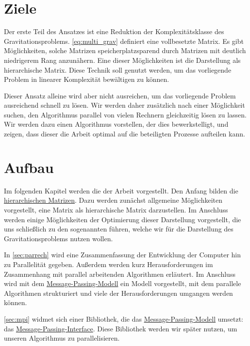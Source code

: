   \section{Ziele}
    Der erste Teil des Ansatzes ist eine Reduktion der Komplexitätsklasse des Gravitationsproblems. \autoref{eq:multi_grav} definiert eine vollbesetzte Matrix. Es gibt Möglichkeiten, solche
    Matrizen speicherplatzsparend durch Matrizen mit deutlich niedrigerem Rang anzunähern. Eine dieser Möglichkeiten ist die Darstellung als hierarchische Matrix. Diese Technik soll genutzt
    werden, um das vorliegende Problem in linearer Komplexität bewältigen zu können.
    
    Dieser Ansatz alleine wird aber nicht ausreichen, um das vorliegende Problem ausreichend schnell zu lösen. Wir werden daher zusätzlich nach einer Möglichkeit suchen, den Algorithmus parallel
    von vielen Rechnern gleichzeitig lösen zu lassen. Wir werden dazu einen Algorithmus vorstellen, der dies bewerkstelligt, und zeigen, dass dieser die Arbeit optimal auf die beteiligten
    Prozesse aufteilen kann.
  
  \section{Aufbau}
    Im folgenden Kapitel werden die  der Arbeit vorgestellt. Den Anfang bilden die \hyperref[sec:h2]{hierarchischen Matrizen}. Dazu werden zunächst allgemeine Möglichkeiten 
    vorgestellt, eine Matrix als hierarchische Matrix darzustellen. Im Anschluss werden einige Möglichkeiten der Optimierung dieser Darstellung vorgestellt, die uns schließlich zu den sogenannten 
     führen, welche wir für die Darstellung des Gravitationsproblems nutzen wollen.
    
    In \autoref{sec:parrech} wird eine Zusammenfassung der Entwicklung der Computer hin zu Parallelität gegeben. Außerdem werden kurz Herausforderungen im Zusammenhang mit parallel arbeitenden
    Algorithmen erläutert. Im Anschluss wird mit dem \hyperref[sec:mpm]{Message-Passing-Modell} ein Modell vorgestellt, mit dem parallele Algorithmen strukturiert und viele der 
    Herausforderungen umgangen werden können.
    
    \autoref{sec:mpi} widmet sich einer Bibliothek, die das \hyperref[sec:mpm]{Message-Passing-Modell} umsetzt: das \hyperref[sec:mpi]{Message-Passing-Interface}. Diese Bibliothek werden wir später
    nutzen, um unseren Algorithmus zu parallelisieren.
    
